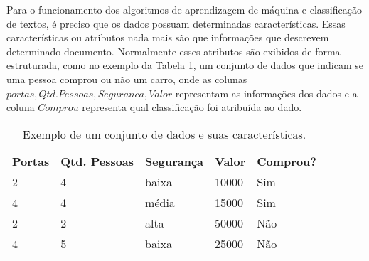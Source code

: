 Para o funcionamento dos algoritmos de aprendizagem de máquina e classificação de textos, é preciso que os dados possuam determinadas características. Essas características ou atributos nada mais são que informações que descrevem determinado documento. Normalmente esses atributos são exibidos de forma estruturada, como no exemplo da Tabela \ref{tab:exemplo-features}, um conjunto de dados que indicam se uma pessoa comprou ou não um carro, onde as colunas $portas, Qtd. Pessoas, Seguranca, Valor$ representam as informações dos dados e a coluna $Comprou$ representa qual classificação foi atribuída ao dado. 
 
\begin{table}[h]
    \centering
    {\renewcommand\arraystretch{1.25}
    \begin{tabular}{ l l l l l }
    \cline{1-1}\cline{2-2}\cline{3-3}\cline{4-4}\cline{5-5}  
    \multicolumn{1}{|p{1.3cm}|}{\textbf{Portas} \centering } &
    \multicolumn{1}{p{3.2cm}|}{\textbf{Qtd. Pessoas} \centering } &
    \multicolumn{1}{p{3.5cm}|}{\textbf{Segurança} \centering } &
    \multicolumn{1}{p{2.4cm}|}{\textbf{Valor} \centering } &
    \multicolumn{1}{p{3.5cm}|}{\textbf{Comprou?} \centering }
  \\  
    \cline{1-1}\cline{2-2}\cline{3-3}\cline{4-4}\cline{5-5}  
    \multicolumn{1}{|p{1.3cm}|}{2 \centering } &
    \multicolumn{1}{p{3.2cm}|}{4 \centering } &
    \multicolumn{1}{p{3.5cm}|}{baixa \centering } &
    \multicolumn{1}{p{2.4cm}|}{10000 \centering } &
    \multicolumn{1}{p{3.5cm}|}{Sim \centering }
  \\  
    \cline{1-1}\cline{2-2}\cline{3-3}\cline{4-4}\cline{5-5}  
    \multicolumn{1}{|p{1.3cm}|}{4 \centering } &
    \multicolumn{1}{p{3.2cm}|}{4 \centering } &
    \multicolumn{1}{p{3.5cm}|}{média \centering } &
    \multicolumn{1}{p{2.4cm}|}{15000 \centering } &
    \multicolumn{1}{p{3.5cm}|}{Sim \centering }
  \\  
    \cline{1-1}\cline{2-2}\cline{3-3}\cline{4-4}\cline{5-5}  
    \multicolumn{1}{|p{1.3cm}|}{2 \centering } &
    \multicolumn{1}{p{3.2cm}|}{2 \centering } &
    \multicolumn{1}{p{3.5cm}|}{alta \centering } &
    \multicolumn{1}{p{2.4cm}|}{50000 \centering } &
    \multicolumn{1}{p{3.5cm}|}{Não \centering }
  \\  
    \cline{1-1}\cline{2-2}\cline{3-3}\cline{4-4}\cline{5-5}  
    \multicolumn{1}{|p{1.3cm}|}{4 \centering } &
    \multicolumn{1}{p{3.2cm}|}{5 \centering } &
    \multicolumn{1}{p{3.5cm}|}{baixa \centering } &
    \multicolumn{1}{p{2.4cm}|}{25000 \centering } &
    \multicolumn{1}{p{3.5cm}|}{Não \centering }
  \\  
    \hline
    \end{tabular} 
    }
    \caption{Exemplo de um conjunto de dados e suas características.}\label{tab:exemplo-features}
\end{table}
 
